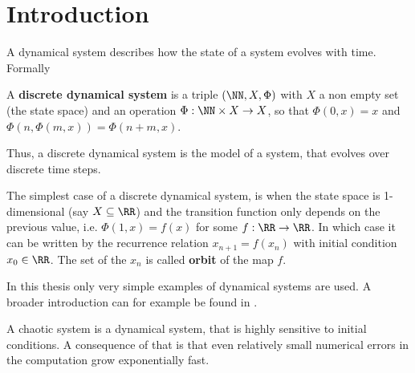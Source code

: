 \section{Introduction}
  A dynamical system describes how the state of a system evolves with time. Formally
  \begin{definition}
    A \textbf{discrete dynamical system} is a triple $(\NN,X,\Phi)$ with $X$ a non empty set (the state space) and an operation $\Phi : \NN \times X \to X$, so that
    $\Phi(0,x) = x$ and $\Phi(n,\Phi(m,x)) = \Phi(n+m, x)$. 
  \end{definition}
  Thus, a discrete dynamical system is the model of a system, that evolves over discrete time steps.

  The simplest case of a discrete dynamical system, is when the state space is 1-dimensional (say $X \subseteq \RR$) and 
  the transition function only depends on the previous value, i.e. $\Phi(1,x) = f(x)$ for some $f : \RR \to \RR$. 
  In which case it can be written by the recurrence relation $x_{n+1} = f(x_n)$ with initial condition $x_0 \in \RR$.
  The set of the $x_n$ is called \textbf{orbit} of the map $f$.

  In this thesis only very simple examples of dynamical systems are used. A broader introduction can for example be found in \cite{katok1997introduction}.

  A chaotic system is a dynamical system, that is highly sensitive to initial conditions.
  A consequence of that is that even relatively small numerical errors in the computation grow exponentially fast.

